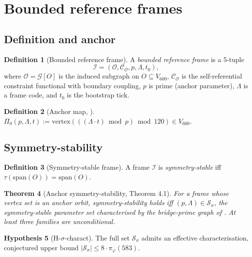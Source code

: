 \documentclass[11pt]{article}
\theoremstyle{plain}
\newtheorem{theorem}{Theorem}[section]
\theoremstyle{definition}
\newtheorem{definition}[theorem]{Definition}
\newtheorem{hypothesis}[theorem]{Hypothesis}
\theoremstyle{remark}
\newcommand{\Ical}{\mathcal{I}}
\newcommand{\Ocal}{\mathcal{O}}
\newcommand{\Ccal}{\mathcal{C}}
\begin{document}
\section{Bounded reference frames}\label{sec:frames}

\subsection{Definition and anchor}

\begin{definition}[Bounded reference frame]\label{def:frame}
A \emph{bounded reference frame} is a 5-tuple
\[
  \Ical = (\Ocal, \Ccal_\Ocal, p, \Lambda, t_0),
\]
where $\Ocal = \mathcal{G}[O]$ is the induced subgraph on $O \subseteq V_{600}$, $\Ccal_\Ocal$ is the self-referential constraint functional with boundary coupling, $p$ is prime (anchor parameter), $\Lambda$ is a frame code, and $t_0$ is the bootstrap tick.
\end{definition}

\begin{definition}[Anchor map, \citet{SmartSoulPrime}]\label{def:anchor}
$\Pi_0(p, \Lambda, t) := \mathrm{vertex}( ((\Lambda \cdot t) \bmod p) \bmod 120 ) \in V_{600}.$
\end{definition}

\subsection{Symmetry-stability}

\begin{definition}[Symmetry-stable frame]\label{def:sigma-stable}
A frame $\Ical$ is \emph{symmetry-stable} iff $\tau(\mathrm{span}(O)) = \mathrm{span}(O)$.
\end{definition}

\begin{theorem}[Anchor symmetry-stability, \citet{PerObserverZeroLine} Theorem 4.1]\label{thm:anchor-sigma}
For a frame whose vertex set is an anchor orbit, symmetry-stability holds iff $(p, \Lambda) \in \mathcal{S}_\sigma$, the symmetry-stable parameter set characterised by the bridge-prime graph of \citet{SmartSoulPrime}. At least three families are unconditional.
\end{theorem}

\begin{hypothesis}[H-$\sigma$-charact]\label{hyp:sigma-charact}
The full set $\mathcal{S}_\sigma$ admits an effective characterisation, conjectured upper bound $|\mathcal{S}_\sigma| \leq 8 \cdot \pi_\varphi(583)$.
\end{hypothesis}
\end{document}
